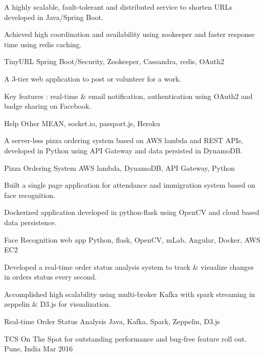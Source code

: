 \documentclass[]{awesome-cv}
\begin{document}
\begin{cventries}
	\cvprojectentry
	{
	\begin{cvitems}
    	\item {A highly scalable, fault-tolerant and distributed service to shorten URLs developed in Java/Spring Boot. }
    	\item {Achieved high coordination and availability using zookeeper and faster response time using redis caching.}
	\end{cvitems}
	}
	{TinyURL}
	{Spring Boot/Security, Zookeeper, Cassandra, redis, OAuth2}
	\cvprojectentry
	{
	\begin{cvitems}
    	\item {A 3-tier web application to post or volunteer for a work.}
    	\item {Key features : real-time \& email notification, authentication using OAuth2 and badge sharing on Facebook.}
	\end{cvitems}
	}
	{Help Other}
	{MEAN, socket.io, passport.js, Heroku}
	\cvprojectentry
	{
	\begin{cvitems}
    	\item {A server-less pizza ordering system based on AWS lambda and REST APIs, developed in Python using API Gateway and data persisted in DynamoDB.}
	\end{cvitems}
	}
	{Pizza Ordering System}
	{AWS lambda, DynamoDB, API Gateway, Python}
	\cvprojectentry
	{
	\begin{cvitems}
    	\item {Built a single page application for attendance and immigration system based on face recognition.}
    	\item {Dockerized application developed in python-flask using OpenCV and cloud based data persistence.}
	\end{cvitems}
	}
	{Face Recognition web app}
	{Python, flask, OpenCV, mLab, Angular, Docker, AWS EC2}
	\cvprojectentry
	{
	\begin{cvitems}
    	\item {Developed a real-time order status analysis system to track \& visualize changes in orders status every second.}
    	\item {Accomplished high scalability using multi-broker Kafka with spark streaming in zeppelin \& D3.js for visualization.}
	\end{cvitems}
	}
	{Real-time Order Status Analysis}
	{Java, Kafka, Spark, Zeppelin, D3.js}
    \vspace{-2mm}
\end{cventries}
\vspace{-3mm}
\begin{cvhonors}
	\cvhonor
	{TCS On The Spot}
	{for outstanding performance and bug-free feature roll out.}
	{Pune, India}
	{Mar 2016}
\end{cvhonors}
\ 
\end{document}
